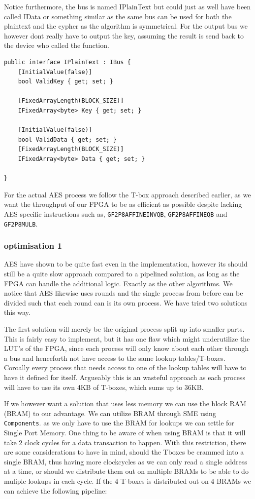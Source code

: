 \documentclass[a4paper]{article}
\begin{document}
Notice furthermore, the bus is named IPlainText but could just as well have been called IData or something similar as the same bus can be used for both the plaintext and the cypher as the algorithm is symmetrical. For the output bus we however dont really have to output the key, assuming the result is send back to the device who called the function.
\begin{verbatim}
public interface IPlainText : IBus {
    [InitialValue(false)]
    bool ValidKey { get; set; }

    [FixedArrayLength(BLOCK_SIZE)]
    IFixedArray<byte> Key { get; set; }

    [InitialValue(false)]
    bool ValidData { get; set; }
    [FixedArrayLength(BLOCK_SIZE)]
    IFixedArray<byte> Data { get; set; }

}
\end{verbatim}
For the actual AES process we follow the T-box approach described earlier, as we want the throughput of our FPGA to be as efficient as possible despite lacking AES specific instructions such as, \texttt{GF2P8AFFINEINVQB}, \texttt{GF2P8AFFINEQB} and \texttt{GF2P8MULB}.
\subsubsection{optimisation 1}
\label{AESopt}
AES have shown to be quite fast even in the implementation, however its should still be a quite slow approach compared to a pipelined solution, as long as the FPGA can handle the additional logic. Exactly as the other algorithms. We notice that AES likewise uses rounds and the single process from before can be divided such that each round can is its own process. We have tried two solutions this way.

The first solution will merely be the original process split up into smaller parts. This is fairly easy to implement, but it has one flaw which might underutilize the LUT's of the FPGA, since each process will only know about each other through a bus and henceforth not have access to the same lookup tables/T-boxes. Coroally every process that needs access to one of the lookup tables will have to have it defined for itself. Argueably this is an wasteful approach as each process will have to use its own 4KB of T-boxes, which sums up to 36KB.

If we however want a solution that uses less memory we can use the block RAM (BRAM) to our advantage. We can utilize BRAM through SME using \texttt{Components}. as we only have to use the BRAM for lookups we can settle for Single Port Memory. One thing to be aware of when using BRAM is that it will take 2 clock cycles for a data transaction to happen. With this restriction, there are some considerations to have in mind, should the Tboxes be crammed into a single BRAM, thus having more clockcycles as we can only read a single address at a time, or should we distribute them out on multiple BRAMs to be able to do muliple lookups in each cycle. If the 4 T-boxes is distributed out on 4 BRAMs we can achieve the following pipeline:
\end{document}
